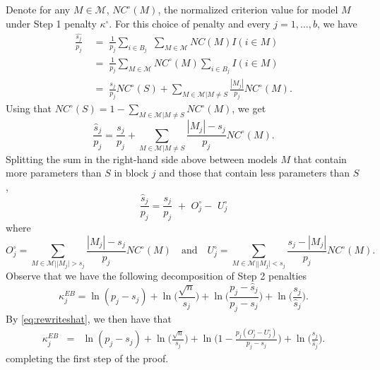 \documentclass[bj,authoryear]{imsart}
\theoremstyle{plain}
\newcommand{\M}{\mathcal{M}}
\begin{document}
Denote for any $M\in\M$, $NC^{\circ}(M)$, the normalized criterion value for model $M$ under Step 1 penalty $\kappa^{\circ}$. For this choice of penalty and every $j=1,\ldots,b$, we have
\begin{align*}
    \frac{\widehat{s_j}}{p_j}
    &\;=\; \frac{1}{p_j}\sum_{i\in B_j}\,\,\sum_{M\in \M}NC(M)I(i\in M)\\
   &\;=\; \frac{1}{p_j}\sum_{M \in \M}NC^{\circ}(M)\sum_{i \in B_j}I(i\in M) \\
   &\;=\;\frac{s_j}{p_j}NC^{\circ}(S) + \sum_{M \in \M | M \neq S}\frac{|M_j|}{p_j}NC^{\circ}(M).
\end{align*}
Using that $NC^{\circ}(S)=1-\sum_{M \in \M | M \neq S}NC^{\circ}(M)$, we get
\begin{equation*}
   \frac{\widehat{s}_j}{p_j}
   =\frac{s_j}{p_j} + \sum_{M \in \M | M \neq S}\frac{|M_j|-s_j}{p_j}NC^{\circ}(M).
\end{equation*}
Splitting the sum in the right-hand side above between models $M$ that
contain more parameters than $S$ in block $j$ and those that contain less parameters than $S$, %
\begin{equation}\label{eq:rewriteshat}
  \frac{\widehat{s}_j}{p_j}  = \frac{s_j}{p_j}\,\,+\,\, O_j^{\circ}-\,\,U_j^{\circ}
\end{equation}
where
$$
    O_j^{\circ} = \sum_{M \in \M | |M_j| > s_j}\frac{|M_j|-s_j}{p_j}NC^{\circ}(M)\quad\text{and}\quad
    U_j^{\circ} = \sum_{M \in \M | |M_j| < s_j}\frac{s_j-|M_j|}{p_j}NC^{\circ}(M).
$$
Observe that we have the following decomposition of Step 2 penalties
$$\kappa^{EB}_j
    = \ln(p_j-s_j) + \ln\Big(\frac{\sqrt{n}}{s_j}\Big) + \ln\Big(\frac{p_j-\widehat{s}_j}{p_j-s_j}\Big) + \ln\Big(\frac{s_j}{\widehat{s}_j}\Big). \nonumber$$
By \eqref{eq:rewriteshat}, we then have that
\begin{eqnarray}\label{eq:decompstep2pen}
    \kappa^{EB}_j&=& \ln(p_j-s_j)+\ln\Big(\frac{\sqrt{n}}{s_j}\Big)+\ln\Big(1-\frac{p_j(O^{\circ}_j-U^{\circ}_j)}{p_j-s_j}\Big)+\ln\Big(\frac{s_j}{\widehat{s}_j}\Big).
\end{eqnarray}
completing the first step of the proof.
\end{document}
